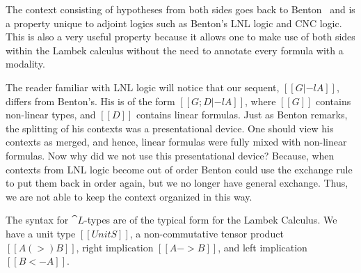 The context consisting of hypotheses from both sides goes back to
Benton~\cite{Benton:1994} and is a property unique to adjoint logics such as
Benton's LNL logic and CNC logic. This is also a very useful property
because it allows one to make use of both sides within the Lambek calculus
without the need to annotate every formula with a modality.

The reader familiar with LNL logic will notice that our sequent,
$[[G |-l A]]$, differs from Benton's. His is of the form $[[G; D |-l A]]$,
where $[[G]]$ contains non-linear types, and $[[D]]$ contains linear
formulas. Just as Benton remarks, the splitting of his contexts was a
presentational device. One should view his contexts as merged, and hence,
linear formulas were fully mixed with non-linear formulas. Now why did we
not use this presentational device? Because, when contexts from LNL logic
become out of order Benton could use the exchange rule to put them back in
order again, but we no longer have general exchange. Thus, we are not able
to keep the context organized in this way.

The syntax for $\cat{L}$-types are of the typical form for the Lambek
Calculus. We have a unit type $[[UnitS]]$, a non-commutative tensor product
$[[A (>) B]]$, right implication $[[A -> B]]$, and left implication
$[[B <- A]]$.

